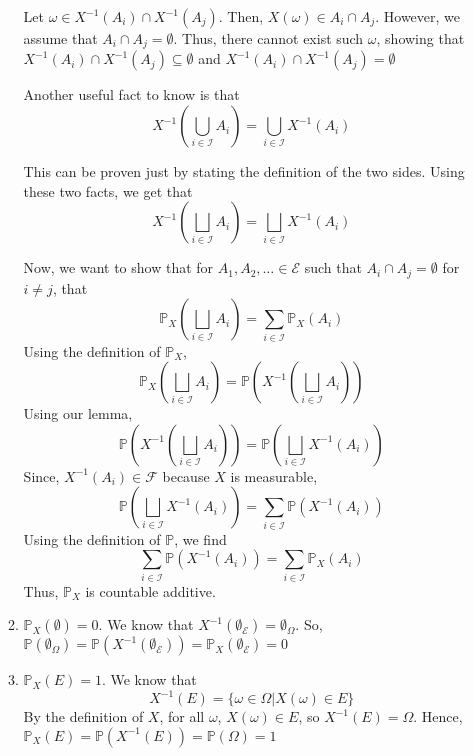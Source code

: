 \documentclass[12pt]{article}
\begin{document}
\begin{enumerate}[start=1,label={\bfseries Problem \arabic*:},leftmargin=1in]
\begin{enumerate}
        Let $\omega \in X^{-1}(A_i) \cap X^{-1}(A_j)$. Then, $X(\omega) \in A_{i} \cap A_{j}$. 
        However, we assume that $A_{i} \cap A_{j} = \emptyset$. Thus, there cannot exist such $\omega$, showing that $X^{-1}(A_i) \cap X^{-1}(A_j) \subseteq \emptyset$ and $X^{-1}(A_i) \cap X^{-1}(A_j) = \emptyset$
        
        Another useful fact to know is that 
        \[
            X^{-1}(\bigcup_{i \in \mathcal{I}}A_{i}) = \bigcup_{i \in \mathcal{I}} X^{-1}(A_{i})
        \]
        
        This can be proven just by stating the definition of the two sides. 
        Using these two facts, we get that
        \[
            X^{-1}(\bigsqcup_{i \in \mathcal{I}}A_{i}) = \bigsqcup_{i \in \mathcal{I}} X^{-1}(A_{i})
        \]
        
        Now, we want to show that for $A_1, A_{2}, \dots \in \mathcal{E}$ such that $A_{i} \cap A_{j} = \emptyset$ for $i \neq j$, that 
        \[
            \mathbb{P}_{X}(\bigsqcup_{i \in \mathcal{I}}A_{i}) = \sum_{i \in \mathcal{I}} \mathbb{P}_{X}(A_{i})
        \]
        Using the definition of $\mathbb{P}_{X}$,
        \[
            \mathbb{P}_{X}(\bigsqcup_{i \in \mathcal{I}}A_{i}) = \mathbb{P}(X^{-1}(\bigsqcup_{i \in \mathcal{I}}A_{i}))
        \]
        Using our lemma, 
        \[
            \mathbb{P}(X^{-1}(\bigsqcup_{i \in \mathcal{I}}A_{i})) = \mathbb{P}(\bigsqcup_{i \in \mathcal{I}}X^{-1}(A_{i}))
        \]
        Since, $X^{-1}(A_{i}) \in \mathcal{F}$ because $X$ is measurable, 
        \[
            \mathbb{P}(\bigsqcup_{i \in \mathcal{I}}X^{-1}(A_{i})) = \sum_{i \in \mathcal{I}} \mathbb{P}(X^{-1}(A_{i}))
        \] 
        Using the definition of $\mathbb{P}$, we find
        \[
            \sum_{i \in \mathcal{I}} \mathbb{P}(X^{-1}(A_{i})) = \sum_{i \in \mathcal{I}}\mathbb{P}_{X}(A_{i})
        \]
        Thus, $\mathbb{P}_{X}$ is countable additive.

        \item $\mathbb{P}_{X}(\emptyset) = 0$. We know that $X^{-1}(\emptyset_{\mathcal{E}}) = \emptyset_{\Omega}$.
        So, $\mathbb{P}(\emptyset_{\Omega}) = \mathbb{P}(X^{-1}(\emptyset_{\mathcal{E}})) = \mathbb{P}_{X}(\emptyset_{\mathcal{E}}) = 0$
        \item $\mathbb{P}_{X}(E) = 1$. We know that 
        \[
        X^{-1}(E) = \{ \omega \in \Omega | X(\omega) \in E\} 
        \]
        By the definition of $X$, for all $\omega$, $X(\omega) \in E$, so $X^{-1}(E) = \Omega$. 
        Hence, $\mathbb{P}_{X}(E) = \mathbb{P}(X^{-1}(E)) = \mathbb{P}(\Omega) = 1$
    \end{enumerate}

\end{enumerate}
\end{document}
